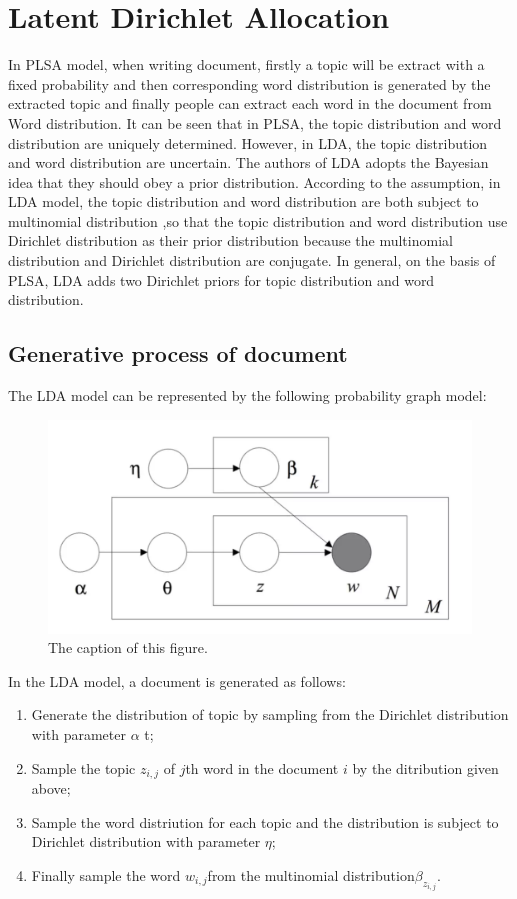 \section{Latent Dirichlet Allocation}
In PLSA model, when writing document, firstly a topic will be extract  with a fixed probability and then  corresponding word distribution is generated by the extracted topic and finally people can extract each word in the document from Word distribution.
It can be seen that in PLSA, the topic distribution and word distribution are uniquely determined. However, in LDA, the topic distribution and word distribution are uncertain. The authors of LDA adopts the Bayesian idea that they should obey a prior distribution. According to the assumption, in LDA model, the topic distribution and word distribution are both  subject to multinomial distribution ,so that the topic distribution and word distribution use Dirichlet distribution as their  prior distribution because the multinomial distribution and Dirichlet distribution are conjugate. In general, on the basis of PLSA, LDA adds two Dirichlet priors for topic distribution and word distribution.
\subsection{Generative process of document}
The LDA model can be represented by the following probability graph model:
\begin{figure}[htbp]
\includegraphics[width = \linewidth]{lda.png}
\caption{The caption of this figure.}
\label{fig:figure1label}
\end{figure}


In the LDA model, a document is generated as follows:
\begin{enumerate}
  \item Generate the  distribution of topic  by sampling from the Dirichlet distribution  with parameter $\alpha$ t;

  \item Sample the topic $z_{i,j}$ of $j$th word in the document $i$ by the ditribution given above;

  \item Sample the word distriution for each topic  and the distribution is subject to  Dirichlet distribution with parameter $\eta$;

  \item Finally sample the word  $w_{i,j}$from the multinomial distribution$\beta_{z_{i,j}}$.

\end{enumerate}

